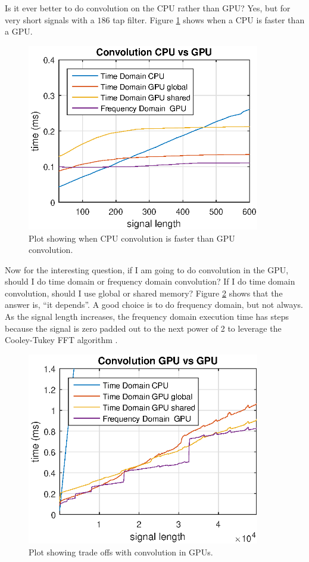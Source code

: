 Is it ever better to do convolution on the CPU rather than GPU?
Yes, but for very short signals with a $186$ tap filter.
Figure \ref{fig:CPUvsGPU_CPUtoGPU} shows when a CPU is faster than a GPU.
\begin{figure}
	\centering\includegraphics[width=4in]{figures/gpu_intro/CPUvsGPU_CPUtoGPU.eps}
	\caption{Plot showing when CPU convolution is faster than GPU convolution.}
	\label{fig:CPUvsGPU_CPUtoGPU}
\end{figure}

Now for the interesting question, if I am going to do convolution in the GPU, should I do time domain or frequency domain convolution?
If I do time domain convolution, should I use global or shared memory?
Figure \ref{fig:CPUvsGPU_GPUtoGPU} shows that the answer is, ``it depends''.
A good choice is to do frequency domain, but not always.
As the signal length increases, the frequency domain execution time has steps because the signal is zero padded out to the next power of 2 to leverage the Cooley-Tukey FFT algorithm \cite{Cooley-Tukey_old}.
\begin{figure}
	\centering\includegraphics[width=4in]{figures/gpu_intro/CPUvsGPU_GPUtoGPU.eps}
	\caption{Plot showing trade offs with convolution in GPUs.}
	\label{fig:CPUvsGPU_GPUtoGPU}
\end{figure}

